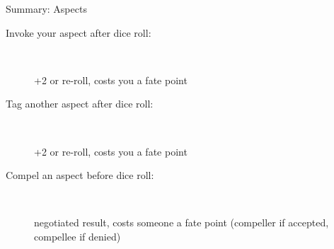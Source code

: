 \begin{sidebox}{Summary: Aspects}
\begin{description}
\item[Invoke your aspect after dice roll:]~

+2 or re-roll, costs you a fate point

\item[Tag another aspect after dice roll:]~

+2 or re-roll, costs you a fate point

\item[Compel an aspect before dice roll:]~

negotiated result, costs someone a fate point (compeller if accepted, compellee if denied)
\end{description}
\end{sidebox}
